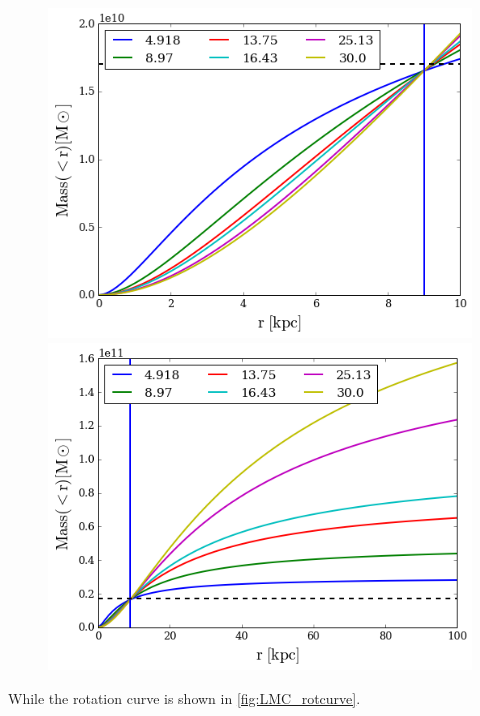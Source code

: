 \begin{figure}[H]{\label{fig:LMC_mass}}
\centering
\includegraphics[scale=0.4]{LMC_mass_hernquist_2.png}
\includegraphics[scale=0.4]{LMC_mass_hernquist_out_2.png}
\end{figure}

While the rotation curve is shown in \ref{fig:LMC_rotcurve}.

